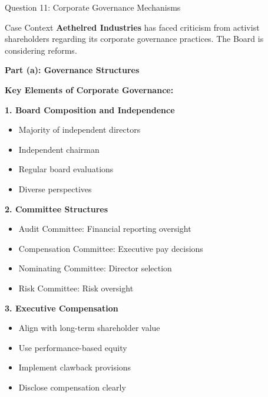 \documentclass[aspectratio=169]{beamer}
\newcommand{\question}[1]{{\large\bfseries\color{crimson}#1}}
\newcommand{\subquestion}[1]{{\bfseries\color{darkgreen}#1}}
\begin{document}
	\begin{frame}{Question 11: Corporate Governance Mechanisms}
		\begin{block}{Case Context}
			\textbf{Aethelred Industries} has faced criticism from activist shareholders regarding its corporate governance practices. The Board is considering reforms.
		\end{block}
		
		\question{Part (a): Governance Structures}
		
		\textbf{Key Elements of Corporate Governance:}
		
		\subquestion{1. Board Composition and Independence}
		\begin{itemize}
			\item Majority of independent directors
			\item Independent chairman
			\item Regular board evaluations
			\item Diverse perspectives
		\end{itemize}
		
		\subquestion{2. Committee Structures}
		\begin{itemize}
			\item Audit Committee: Financial reporting oversight
			\item Compensation Committee: Executive pay decisions
			\item Nominating Committee: Director selection
			\item Risk Committee: Risk oversight
		\end{itemize}
		
		\subquestion{3. Executive Compensation}
		\begin{itemize}
			\item Align with long-term shareholder value
			\item Use performance-based equity
			\item Implement clawback provisions
			\item Disclose compensation clearly
		\end{itemize}
	\end{frame}
	
\end{document}
